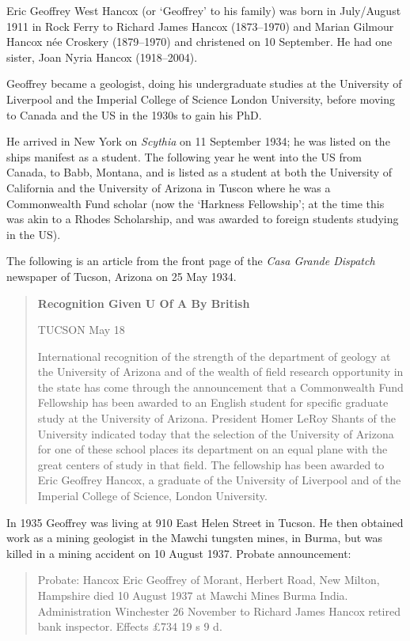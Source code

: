 
Eric Geoffrey West Hancox (or `Geoffrey' to his family) was  born in July/August 1911 in Rock Ferry\cite{EGWHbirth} to Richard James Hancox (1873--1970) and Marian Gilmour Hancox n\'{e}e Croskery (1879--1970) and christened on 10 September.\cite{EGWHchristening} He had one sister, Joan Nyria Hancox (1918--2004).

Geoffrey became a geologist, doing his undergraduate studies at the University of Liverpool and the Imperial College of Science London University, before moving to Canada and the US in the 1930s to gain his PhD.

He arrived in New York on \emph{Scythia} on 11 September 1934; he was listed on the ships manifest as a student.\cite{NYpassengers}
The following year he went into the US from Canada, to Babb, Montana, and is listed as a student at both the University of California and the University of Arizona in Tuscon\cite{USCanadaBorderCrossings} where he was a Commonwealth Fund scholar (now the `Harkness Fellowship'; at the time this was akin to a Rhodes Scholarship, and was awarded to foreign students studying in the US).

The following is an article from the front page of the \emph{Casa Grande Dispatch} newspaper of Tucson, Arizona on 25 May 1934.\cite{CasaP1}

\begin{quotation}
\textbf{Recognition Given U Of A By British}

TUCSON May 18

International recognition of the strength of the department of geology at the University of Arizona and of the wealth of field research opportunity in the state has come through the announcement that a Commonwealth Fund Fellowship has been awarded to an English student for specific graduate study at the University of Arizona. President Homer LeRoy Shants of the University indicated today that the selection of the University of Arizona for one of these school places its department on an equal plane with the great centers of study in that field. The fellowship has been awarded to Eric Geoffrey Hancox, a graduate of the University of Liverpool and of the Imperial College of Science, London University.
\end{quotation}

In 1935 Geoffrey was living at 910 East Helen Street in Tucson.\cite{USCities}
He then obtained work as a mining geologist in  the Mawchi tungsten mines, in Burma, but was killed in a mining accident on 10 August 1937.
Probate announcement:\cite{NationalProbateCalendar}
\begin{quotation}
Probate: Hancox Eric Geoffrey of Morant, Herbert Road, New Milton, Hampshire died 10 August 1937 at Mawchi Mines Burma India. Administration Winchester 26 November to Richard James Hancox retired bank inspector. Effects \pounds734 19 s 9 d.
\end{quotation}
